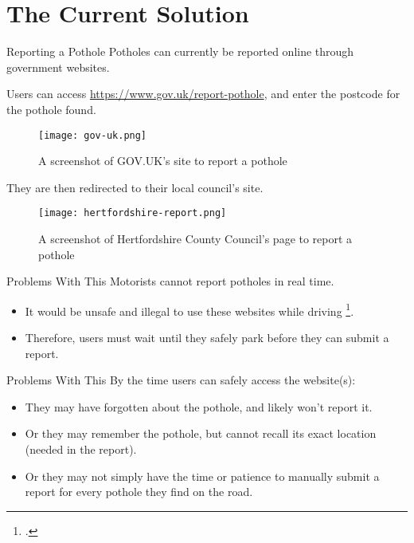 \documentclass{beamer}
\begin{document}
\section{The Current Solution}

\begin{frame}{Reporting a Pothole}
    Potholes can currently be reported online through government websites.
\end{frame}

\begin{frame}
    Users can access \url{https://www.gov.uk/report-pothole}, and enter the postcode for the pothole found.
    \begin{figure}
        \texttt{[image: gov-uk.png]}
        \caption{A screenshot of GOV.UK's site to report a pothole}
    \end{figure}
\end{frame}

\begin{frame}
    They are then redirected to their local council's site.
    \begin{figure}
        \texttt{[image: hertfordshire-report.png]}
        \caption{A screenshot of Hertfordshire County Council's page to report a pothole}
    \end{figure}
\end{frame}

\begin{frame}{Problems With This}
    Motorists cannot report potholes in real time.
    \begin{itemize}
        \item It would be unsafe and illegal to use these websites while driving \footcite{highway-code}.
        \item Therefore, users must wait until they safely park before they can submit a report.
    \end{itemize}
\end{frame}

\begin{frame}{Problems With This}
    By the time users can safely access the website(s):
    \begin{itemize}
        \item They may have forgotten about the pothole, and likely won't report it.
        \item Or they may remember the pothole, but cannot recall its exact location (needed in the report).
        \item Or they may not simply have the time or patience to manually submit a report for every pothole they find on the road.
    \end{itemize}
\end{frame}
\end{document}
